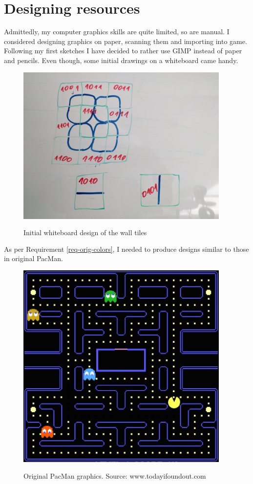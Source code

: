 \documentclass[11pt,a4paper,notitlepage]{report}
\newenvironment{img}{
	\begin{center}
		\begin{figure}[H]
			\begin{center}
			
}{
	\end{center}
		\end{figure}
			\end{center}
}
\begin{document}
		\section{Designing resources}
			Admittedly, my computer graphics skills are quite limited, so are manual. I considered designing graphics on paper, scanning them and importing into game. Following my first sketches I have decided to rather use GIMP instead of paper and pencils. Even though, some initial drawings on a whiteboard came handy.\\
			\begin{img}
				\includegraphics[width=300pt]{images/wall-whiteboard-design.jpg}\\
				\caption{Initial whiteboard design of the wall tiles}
			\end{img}
			As per Requirement \ref{req-orig-colors}, I needed to produce designs similar to those in original PacMan.
			\begin{img}
				\includegraphics[width=300pt]{images/original-graphics.jpg}\\
				\caption{Original PacMan graphics. Source: www.todayifoundout.com}
			\end{img}
\end{document}
